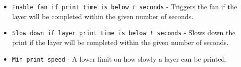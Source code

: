 \begin{itemize}
	\item \texttt{Enable fan if print time is below \textit{t} seconds}  - Triggers the fan if the layer will be completed within the given number of seconds.
	\item \texttt{Slow down if layer print time is below \textit{t} seconds}  - Slows down the print if the layer will be completed within the given number of seconds.
	\item \texttt{Min print speed}  - A lower limit on how slowly a layer can be printed.
\end{itemize}



